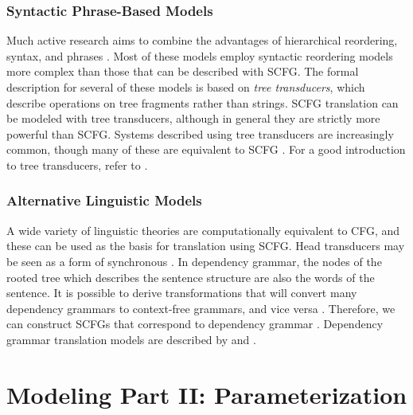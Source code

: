 \subsubsection{Syntactic Phrase-Based Models}\label{sec:syntactic-phrase-based}

Much active research aims to combine the
advantages of hierarchical reordering, syntax, and phrases
\citep{Marcu:2006:emnlp,Galley:2006:acl,Quirk:2005:acl}.
Most of these models employ syntactic reordering models more
complex than those that can be described with SCFG.  The
formal description for several of these models is based on 
{\em tree transducers}, which describe
operations on tree fragments rather than strings.  SCFG
translation can be modeled with tree transducers, although
in general they are strictly more powerful than SCFG.
Systems described using tree transducers are increasingly common, though
many of these are equivalent to SCFG
\citep{Graehl:2004:naacl,Galley:2006:acl,Marcu:2006:emnlp}.
For a good introduction to tree transducers, refer to \citet{Knight:2004:cicling}.

\subsubsection{Alternative Linguistic Models}\label{sec:alternative-syntactic-models}

A wide variety of linguistic theories
are computationally equivalent to CFG, and these can be
used as the basis for translation using SCFG.
Head transducers may be seen as a form of
synchronous  \citep{Alshawi:2000:cl}.  In dependency grammar,
the nodes of the rooted tree which describes the sentence
structure are also the words of the sentence.  It is possible
to derive transformations that will convert many dependency grammars
to context-free grammars, and vice versa \citep{Collins:1999:acl}.  
Therefore, we can construct SCFGs that correspond to 
dependency grammar \citep{Melamed:2003:naacl-main}.
Dependency grammar translation models
are described by \citet{Gildea:2004:emnlp} and \citet{Quirk:2005:acl}.


\section{Modeling Part II: Parameterization}\label{sec:mathematical-modeling}

